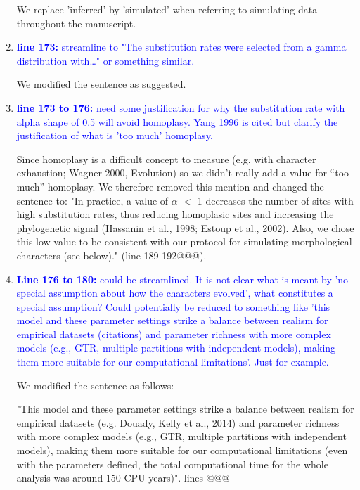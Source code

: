 \documentclass[12pt,letterpaper]{article}
\begin{document}
\begin{enumerate}
We replace 'inferred' by 'simulated' when referring to simulating data throughout the manuscript.

\item{\textcolor{blue}{\textbf{line 173:} streamline to "The substitution rates were selected from a gamma distribution with…" or something similar. }}

We modified the sentence as suggested.

\item{\textcolor{blue}{\textbf{line 173 to 176:} need some justification for why the substitution rate with alpha shape of 0.5 will avoid homoplasy. Yang 1996 is cited but clarify the justification of what is 'too much' homoplasy. }}

Since homoplasy is a difficult concept to measure (e.g. with character exhaustion; Wagner 2000, Evolution) so we didn't really add a value for ``too much'' homoplasy.
We therefore removed this mention and changed the sentence to:
"In practice, a value of $\alpha$ $<$ 1 decreases the number of sites with high substitution rates, thus reducing homoplasic sites and increasing the phylogenetic signal (Hassanin et al., 1998; Estoup et al., 2002).%
Also, we chose this low value to be consistent with our protocol for simulating morphological characters (see below)." (line 189-192@@@).

\item{\textcolor{blue}{\textbf{Line 176 to 180:} could be streamlined. It is not clear what is meant by 'no special assumption about how the characters evolved', what constitutes a special assumption? Could potentially be reduced to something like 'this model and these parameter settings strike a balance between realism for empirical datasets (citations) and parameter richness with more complex models (e.g., GTR, multiple partitions with independent models), making them more suitable for our computational limitations'. Just for example.}}

We modified the sentence as follows:

"This model and these parameter settings strike a balance between realism for empirical datasets  (e.g. Douady, Kelly et al., 2014) and parameter richness with more complex models (e.g., GTR, multiple partitions with independent models), making them more suitable for our computational limitations (even with the parameters defined, the total computational time for the whole analysis was around 150 CPU years)". lines @@@


\end{enumerate}
\end{document}
